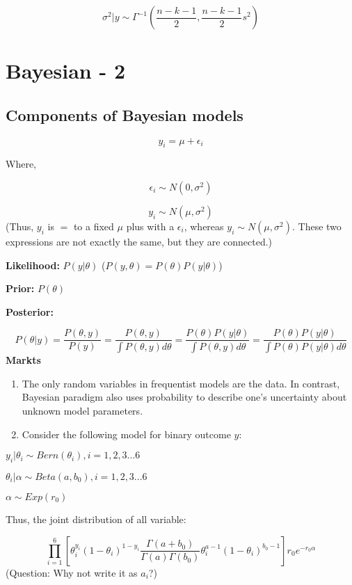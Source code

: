 \documentclass[
]{book}
\begin{document}
\[\sigma^2|y \sim \Gamma^{-1}(\frac{n-k-1}{2},\frac{n-k-1}{2}s^2)\]

\hypertarget{bayesian---2}{%
\chapter{Bayesian - 2}\label{bayesian---2}}

\hypertarget{components-of-bayesian-models}{%
\section{Components of Bayesian models}\label{components-of-bayesian-models}}

\[y_i=\mu+\epsilon_i\]

Where,

\[\epsilon_i \sim N(0, \sigma^2)\]

\[y_i \sim N(\mu, \sigma^2)\]
(Thus, \(y_i\) is \(=\) to a fixed \(\mu\) plus with a \(\epsilon_i\), whereas \(y_i \sim N(\mu, \sigma^2)\). These two expressions are not exactly the same, but they are connected.)

\textbf{Likelihood:} \(P(y|\theta)\) (\(P(y,\theta)=P(\theta)P(y|\theta)\))

\textbf{Prior:} \(P(\theta)\)

\textbf{Posterior:}

\[P(\theta|y)=\frac{P(\theta, y)}{P(y)}=\frac{P(\theta, y)}{\int P(\theta, y)d\theta}=\frac{P(\theta)P(y|\theta)}{\int P(\theta, y)d\theta}=\frac{P(\theta)P(y|\theta)}{\int P(\theta)P(y|\theta)d\theta}\]
\textbf{Markts}

\begin{enumerate}
\def\labelenumi{(\arabic{enumi})}
\item
  The only random variables in frequentist models are the data. In contrast, Bayesian paradigm also uses probability to describe one's uncertainty about unknown model parameters.
\item
  Consider the following model for binary outcome \(y\):
\end{enumerate}

\(y_i|\theta_i \sim Bern (\theta_i), i=1,2,3...6\)

\(\theta_i |\alpha \sim Beta(a, b_0), i=1,2,3...6\)

\(\alpha \sim Exp(r_0)\)

Thus, the joint distribution of all variable:

\[\prod_{i=1}^{6}[\theta_i^{y_i}(1-\theta_i)^{1-y_i}\frac{\Gamma(a+b_0)}{\Gamma(a)\Gamma(b_0)}\theta_i^{a-1}(1-\theta_i)^{b_0-1}]r_0e^{-r_0 \alpha}\]
(Question: Why not write it as \(a_i\)?)
\end{document}
